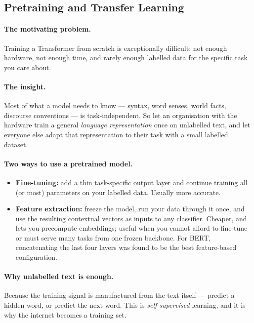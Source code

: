 \documentclass[11pt,a4paper]{article}
\begin{document}
\subsection{Pretraining and Transfer Learning}

\paragraph{The motivating problem.} Training a Transformer from scratch is exceptionally
difficult: not enough hardware, not enough time, and rarely enough labelled data for the
specific task you care about.

\paragraph{The insight.} Most of what a model needs to know --- syntax, word senses, world
facts, discourse conventions --- is task-independent. So let an organisation with the
hardware train a general \emph{language representation} once on unlabelled text, and let
everyone else adapt that representation to their task with a small labelled dataset.

\paragraph{Two ways to use a pretrained model.}
\begin{itemize}
\item \textbf{Fine-tuning:} add a thin task-specific output layer and continue training all
  (or most) parameters on your labelled data. Usually more accurate.
\item \textbf{Feature extraction:} freeze the model, run your data through it once, and use
  the resulting contextual vectors as inputs to any classifier. Cheaper, and lets you
  precompute embeddings; useful when you cannot afford to fine-tune or must serve many tasks
  from one frozen backbone. For BERT, concatenating the last four layers was found to be the
  best feature-based configuration.
\end{itemize}

\paragraph{Why unlabelled text is enough.} Because the training signal is manufactured from
the text itself --- predict a hidden word, or predict the next word. This is
\emph{self-supervised} learning, and it is why the internet becomes a training set.
\end{document}
